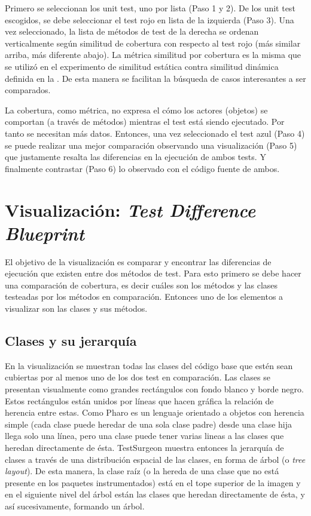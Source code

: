 \par Primero se seleccionan los unit test, uno por lista (Paso 1 y 2). De los unit test escogidos, se debe seleccionar el test rojo en lista de la izquierda (Paso 3). Una vez seleccionado, la lista de métodos de test de la derecha se ordenan verticalmente según similitud de cobertura con respecto al test rojo (más similar arriba, más diferente abajo). La métrica similitud por cobertura es la misma que se utilizó en el experimento de similitud estática contra similitud dinámica definida en la . De esta manera se facilitan la búsqueda de casos interesantes a ser comparados. 

\par La cobertura, como métrica, no expresa el cómo los actores (objetos) se comportan (a través de métodos) mientras el test está siendo ejecutado. Por tanto se necesitan más datos. Entonces, una vez seleccionado el test azul (Paso 4) se puede realizar una mejor comparación observando una visualización (Paso 5) que justamente resalta las diferencias en la ejecución de ambos tests. Y finalmente contrastar (Paso 6) lo observado con el código fuente de ambos.



\section{Visualización: \emph{Test Difference Blueprint}}

\par El objetivo de la visualización es comparar y encontrar las diferencias de ejecución que existen entre dos métodos de test. Para esto primero se debe hacer una comparación de cobertura, es decir cuáles son los métodos y las clases testeadas por los métodos en comparación. Entonces uno de los elementos a visualizar son las clases y sus métodos. 

\subsection{Clases y su jerarquía}

\par En la visualización se muestran todas las clases del código base que estén sean cubiertas por al menos uno de los dos test en comparación. Las clases se presentan visualmente como grandes rectángulos con fondo blanco y borde negro. Estos rectángulos están unidos por líneas que hacen gráfica la relación de herencia entre estas. Como Pharo es un lenguaje orientado a objetos con herencia simple (cada clase puede heredar de una sola clase padre) desde una clase hija llega solo una línea, pero una clase puede tener varias lineas a las clases que heredan directamente de ésta. TestSurgeon muestra entonces la jerarquía de clases a través de una distribución espacial de las clases, en forma de árbol (o \emph{tree layout}). De esta manera, la clase raíz (o la hereda de una clase que no está presente en los paquetes instrumentados) está en el tope superior de la imagen y en el siguiente nivel del árbol están las clases que heredan directamente de ésta, y así sucesivamente, formando un árbol.

